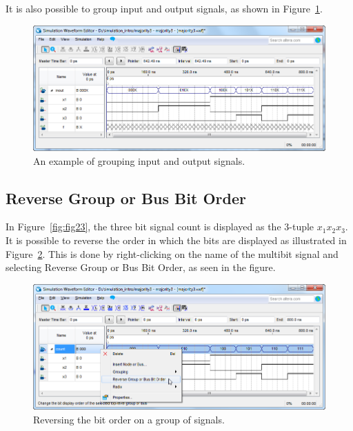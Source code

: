 \documentclass[11pt, twoside, pdftex]{article}
\begin{document}
It is also possible to group input and output signals, as shown in Figure~\ref{fig:fig25}.
\begin{figure}[H]
   \begin{center}
      \includegraphics[scale=0.65]{figures/appendix/figure25.png}
   \caption{An example of grouping input and output signals.} 
	 \label{fig:fig25}
	 \end{center}
\end{figure} 

\subsection{Reverse Group or Bus Bit Order}
In Figure~\ref{fig:fig23}, the three bit signal count is displayed as the 3-tuple $x_1 x_2 x_3$. 
It is possible to reverse the order in which the bits are displayed as illustrated in Figure~\ref{fig:fig26}.
This is done by right-clicking on the name of the multibit signal and selecting {\sf Reverse Group or Bus Bit Order}, 
as seen in the figure.
\begin{figure}[H]
   \begin{center}
      \includegraphics[scale=0.65]{figures/appendix/figure26.png}
   \caption{Reversing the bit order on a group of signals.} 
	 \label{fig:fig26}
	 \end{center}
\end{figure} 
\end{document}
